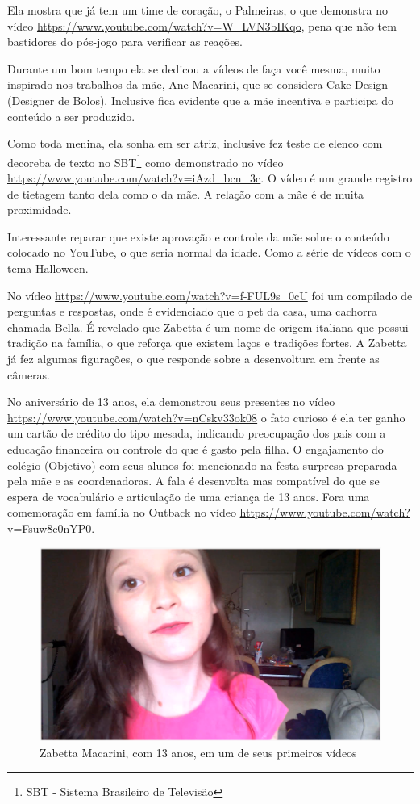Ela mostra que já tem um time de coração, o Palmeiras, o que demonstra no vídeo \url{https://www.youtube.com/watch?v=W_LVN3bIKqo}, pena que não tem bastidores do pós-jogo para verificar as reações.

Durante um bom tempo ela se dedicou a vídeos de faça você mesma, muito inspirado nos trabalhos da mãe, Ane Macarini, que se considera Cake Design (Designer de Bolos). Inclusive fica evidente que a mãe incentiva e participa do conteúdo a ser produzido.

Como toda menina, ela sonha em ser atriz, inclusive fez teste de elenco com decoreba de texto no SBT\footnote{SBT - Sistema Brasileiro de Televisão} como demonstrado no vídeo \url{https://www.youtube.com/watch?v=iAzd_bcn_3c}. O vídeo é um grande registro de tietagem tanto dela como o da mãe. A relação com a mãe é de muita proximidade.

Interessante reparar que existe aprovação e controle da mãe sobre o conteúdo colocado no YouTube, o que seria normal da idade. Como a série de vídeos com o tema Halloween.

No vídeo \url{https://www.youtube.com/watch?v=f-FUL9s_0cU} foi um compilado de perguntas e respostas, onde é evidenciado que o pet da casa, uma cachorra chamada Bella. É revelado que Zabetta é um nome de origem italiana que possui tradição na família, o que reforça que existem laços e tradições fortes. A Zabetta já fez algumas figurações, o que responde sobre a desenvoltura em frente as câmeras.

No aniversário de 13 anos, ela demonstrou seus presentes no vídeo \url{https://www.youtube.com/watch?v=nCskv33ok08} o fato curioso é ela ter ganho um cartão de crédito do tipo mesada, indicando preocupação dos pais com a educação financeira ou controle do que é gasto pela filha. O engajamento do colégio (Objetivo) com seus alunos foi mencionado na festa surpresa preparada pela mãe e as coordenadoras. A fala é desenvolta mas compatível do que se espera de vocabulário e articulação de uma criança de 13 anos. Fora uma comemoração em família no Outback no vídeo \url{https://www.youtube.com/watch?v=Fsuw8c0nYP0}.

\begin{figure}
    \centering
    \includegraphics[width=0.7\linewidth]{fig/Zabetta-13-anos}
    \caption{Zabetta Macarini, com 13 anos, em um de seus primeiros vídeos}
    \label{fig:zabetta-13-anos}
\end{figure}


